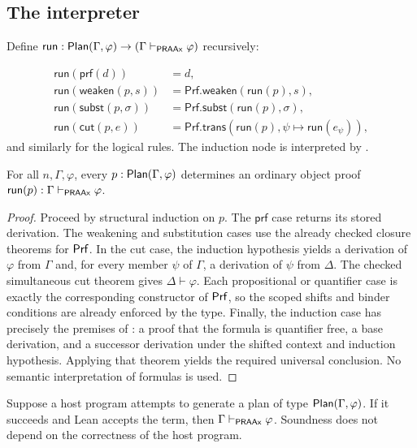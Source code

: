 \subsection{The interpreter}

Define \(\mathsf{run}:\mathsf{Plan}(\Gamma,\varphi)\to
(\Gamma\vdash_{\mathsf{PRAAx}}\varphi)\) recursively:

\begin{align*}
\mathsf{run}(\mathsf{prf}(d))&=d,\\
\mathsf{run}(\mathsf{weaken}(p,s))&=\mathsf{Prf.weaken}(\mathsf{run}(p),s),\\
\mathsf{run}(\mathsf{subst}(p,\sigma))&=\mathsf{Prf.subst}(\mathsf{run}(p),\sigma),\\
\mathsf{run}(\mathsf{cut}(p,e))&=\mathsf{Prf.trans}
   (\mathsf{run}(p),\psi\mapsto\mathsf{run}(e_\psi)),
\end{align*}
and similarly for the logical rules.  The induction node is interpreted by
.

\begin{theorem}\label{thm:plan-soundness}
For all \(n,\Gamma,\varphi\), every \(p:\mathsf{Plan}(\Gamma,\varphi)\) determines an ordinary object
proof \(\mathsf{run}(p):\Gamma\vdash_{\mathsf{PRAAx}}\varphi\).
\end{theorem}

\begin{proof}
Proceed by structural induction on \(p\).  The \(\mathsf{prf}\) case returns its stored derivation.
The weakening and substitution cases use the already checked closure theorems for \(\mathsf{Prf}\).  In the
cut case, the induction hypothesis yields a derivation of \(\varphi\) from \(\Gamma\) and, for every
member \(\psi\) of \(\Gamma\), a derivation of \(\psi\) from \(\Delta\).  The checked simultaneous
cut theorem  gives \(\Delta\vdash\varphi\).  Each propositional or quantifier case is
exactly the corresponding constructor of \(\mathsf{Prf}\), so the scoped shifts and binder conditions are
already enforced by the type.  Finally, the induction case has precisely the premises of
: a proof that the formula is quantifier free, a base derivation, and a successor
derivation under the shifted context and induction hypothesis.  Applying that theorem yields the
required universal conclusion.  No semantic interpretation of formulas is used.
\end{proof}

\begin{corollary}
Suppose a host program attempts to generate a plan of type \(\mathsf{Plan}(\Gamma,\varphi)\).  If it succeeds
and Lean accepts the term, then \(\Gamma\vdash_{\mathsf{PRAAx}}\varphi\).  Soundness does not depend on the
correctness of the host program.
\end{corollary}

